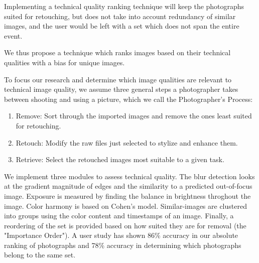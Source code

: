 \documentclass{article}
\begin{document}

Implementing a technical quality ranking technique will keep the photographs suited for retouching, but does not take into account redundancy of similar images, and the user would be left with a set which does not span the entire event.


We thus propose a technique which ranks images based on their technical qualities with a bias for unique images.%

To focus our research and determine which image qualities are relevant to technical image quality, we assume three general steps a photographer takes between shooting and using a picture, which we call the Photographer's Process:
\begin{enumerate}
\item Remove: Sort through the imported images and remove the ones least suited for retouching.
\item Retouch: Modify the raw files just selected to stylize and enhance them.
\item Retrieve: Select the retouched images most suitable to a given task.
\end{enumerate}

We implement three modules to assess technical quality. The blur detection looks at the gradient magnitude of edges and the similarity to a predicted out-of-focus image. Exposure is measured by finding the balance in brightness throghout the image. Color harmony is based on Cohen's model\cite{Cohen-Or:2006:CH:1179352.1141933}. Similar-images are clustered into groups using the color content and timestamps of an image. Finally, a reordering of the set is provided based on how suited they are for removal (the "Importance Order"). A user study has shown 86\% accuracy in our absolute ranking of photographs and 78\% accuracy in determining which photographs belong to the same set. %
\end{document}
